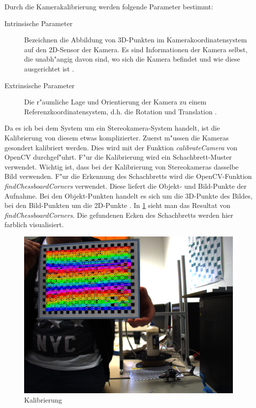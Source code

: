 \noindent Durch die Kamerakalibrierung werden folgende Parameter bestimmt:

\begin{description}
	\item[Intrinsische Parameter]
	Bezeichnen die Abbildung von 3D-Punkten im Kamerakoordinatensystem auf den 2D-Sensor der Kamera. Es sind Informationen der Kamera selbst, die unabh"angig davon sind, wo sich die Kamera befindet und wie diese ausgerichtet ist \cite{Intr}.
	
	\item[Extrinsische Parameter]
	Die r"aumliche Lage und Orientierung der Kamera zu einem Referenzkoordinatensystem, d.h. die Rotation und Translation \cite{cal} \cite{extr}.
\end{description}

\noindent Da es ich bei dem System um ein Stereokamera-System handelt, ist die Kalibrierung von diesem etwas komplizierter.\newline
Zuerst m"ussen die Kameras gesondert kalibriert werden. Dies wird mit der Funktion \textit{calibrateCamera} von OpenCV durchgef"uhrt. F"ur die Kalibrierung wird ein Schachbrett-Muster verwendet. Wichtig ist, dass bei der Kalibrierung von Stereokameras dasselbe Bild verwenden. F"ur die Erkennung des Schachbretts wird die OpenCV-Funktion \textit{findChessboardCorners} verwendet. Diese liefert die Objekt- und Bild-Punkte der Aufnahme. Bei den Objekt-Punkten handelt es sich um die 3D-Punkte des Bildes, bei den Bild-Punkten um die 2D-Punkte \cite{OcvD}. In \ref{fig:chessboards} sieht man das Resultat von \textit{findChessboardCorners}. Die gefundenen Ecken des Schachbretts werden hier farblich visualisiert.

\begin{figure}[H]
	\includegraphics[scale=0.4]{bilder/calibration}
	\caption[Kalibrierung]{Kalibrierung}
	\label{fig:chessboards}
\end{figure}

